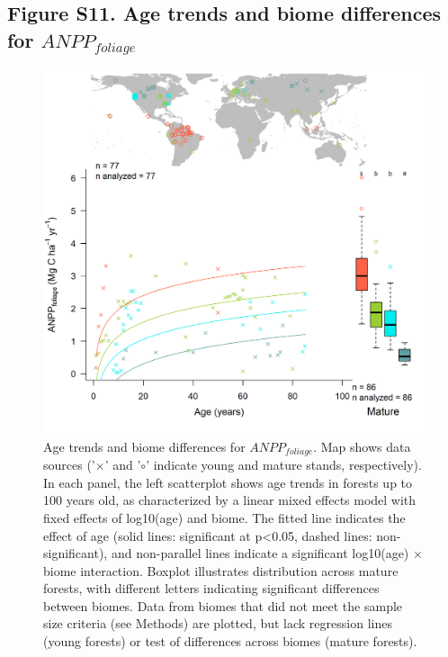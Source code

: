 \documentclass[
]{article}
\begin{document}
\newpage

\hypertarget{figure-s11.-age-trends-and-biome-differences-for-anpp_foliage}{%
\subsection{\texorpdfstring{Figure S11. Age trends and biome differences
for
\(ANPP_{foliage}\)}{Figure S11. Age trends and biome differences for ANPP\_\{foliage\}}}\label{figure-s11.-age-trends-and-biome-differences-for-anpp_foliage}}

\begin{figure}[H]

{\centering \includegraphics[width=1\linewidth]{tables_figures/age_trends/ANPP_foliage_with_map} 

}

\caption{Age trends and biome differences for $ANPP_{foliage}$. Map shows data sources ('$\times$' and '$\circ$' indicate young and mature stands, respectively). In each panel, the left scatterplot shows age trends in forests up to 100 years old, as characterized by a linear mixed effects model with fixed effects of log10(age) and biome. The fitted line indicates the effect of age (solid lines: significant at p<0.05, dashed lines: non-significant), and non-parallel lines indicate a significant log10(age) $\times$ biome interaction. Boxplot illustrates distribution across mature forests, with different letters indicating significant differences between biomes. Data from biomes that did not meet the sample size criteria (see Methods) are plotted, but lack regression lines (young forests) or test of differences across biomes (mature forests).}\label{fig:unnamed-chunk-14}
\end{figure}
\end{document}
